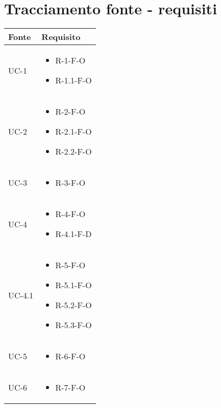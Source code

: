 \section{Tracciamento fonte - requisiti}\label{subsec:tracciamento-fonte---requisiti}

\renewcommand{\arraystretch}{1.5}
\begin{center}
    \begin{longtable}{| C{6cm} |C{6cm}|} \hline
    \textbf{Fonte} & \textbf{Requisito} \\\hline
    UC-1 &
    \begin{itemize}
        \item R-1-F-O
        \item R-1.1-F-O
    \end{itemize}
    \\\hline
    UC-2 &
    \begin{itemize}
        \item R-2-F-O
        \item R-2.1-F-O
        \item R-2.2-F-O
    \end{itemize}
    \\\hline
    UC-3 &
    \begin{itemize}
        \item R-3-F-O
    \end{itemize}\\\hline
    UC-4 &
    \begin{itemize}
        \item R-4-F-O
        \item R-4.1-F-D
    \end{itemize}\\\hline
    UC-4.1 &
    \begin{itemize}
        \item R-5-F-O
        \item R-5.1-F-O
        \item R-5.2-F-O
        \item R-5.3-F-O
    \end{itemize}\\\hline
    UC-5 &
    \begin{itemize}
        \item R-6-F-O
    \end{itemize}\\\hline
    UC-6 &
    \begin{itemize}
        \item R-7-F-O
    \end{itemize}\\\hline

\end{longtable}
\end{center}
